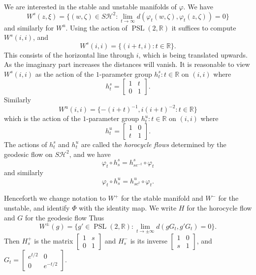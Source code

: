 \documentclass[12pt]{report}
\newcommand{\RR}{\mathbb{R}}
\newcommand{\HH}{\mathcal H}
\newcommand{\PSL}{\operatorname{PSL}}
\newcommand{\dfn}[1]{\emph{#1}\index{#1}}
\theoremstyle{definition}
\begin{document}
We are interested in the stable and unstable manifolds of $\varphi$. We have
$$W^s(z, \xi) = \{(w, \zeta) \in S\HH^2: \lim_{t \to \infty} d(\varphi_t(w, \zeta), \varphi_t(z, \zeta)) = 0\}$$
and similarly for $W^u$. Using the action of $\PSL(2, \RR)$ it suffices to compute $W^s(i, i)$, and
$$W^s(i, i) = \{(i + t, i): t \in \RR\}.$$
This consists of the horizontal line through $i$, which is being translated upwards. As the imaginary part increases the distances will vanish.
It is reasonable to view $W^s(i, i)$ as the action of the $1$-parameter group $h^s_t: t \in \RR$ on $(i, i)$ where
$$h^s_t = \begin{bmatrix}1&t\\
0 & 1\end{bmatrix}.$$
Similarly
$$W^u(i, i) = \{-(i+t)^{-1}, i(i+t)^{-2}: t \in \RR\}$$
which is the action of the $1$-parameter group $h^u_t: t \in \RR$ on $(i, i)$ where
$$h^u_t = \begin{bmatrix}
1 & 0\\
t & 1
\end{bmatrix}.$$
The actions of $h^s_t$ and $h^u_t$ are called the \dfn{horocycle flows} determined by the geodesic flow on $S\HH^2$, and we have
$$\varphi_t \circ h^s_s = h^s_{se^{-t}} \circ \varphi_t$$
and similarly
$$\varphi_t \circ h^u_s = h^u_{se^t} \circ \varphi_t.$$

Henceforth we change notation to $W^+$ for the stable manifold and $W^-$ for the unstable, and identify $\Phi$ with the identity map.
We write $H$ for the horocycle flow and $G$ for the geodesic flow
Thus
$$W^\pm(g) = \{g' \in \PSL(2, \RR): \lim_{t \to \pm \infty} d(gG_t, g'G_t) = 0\}.$$
Then $H_s^+$ is the matrix $\begin{bmatrix}1&s\\0&1\end{bmatrix}$ and $H_s^-$ is its inverse $\begin{bmatrix}1&0\\s&1\end{bmatrix}$, and
$G_t = \begin{bmatrix}e^{t/2}&0\\ 0 &e^{-t/2}\end{bmatrix}$.
\end{document}
